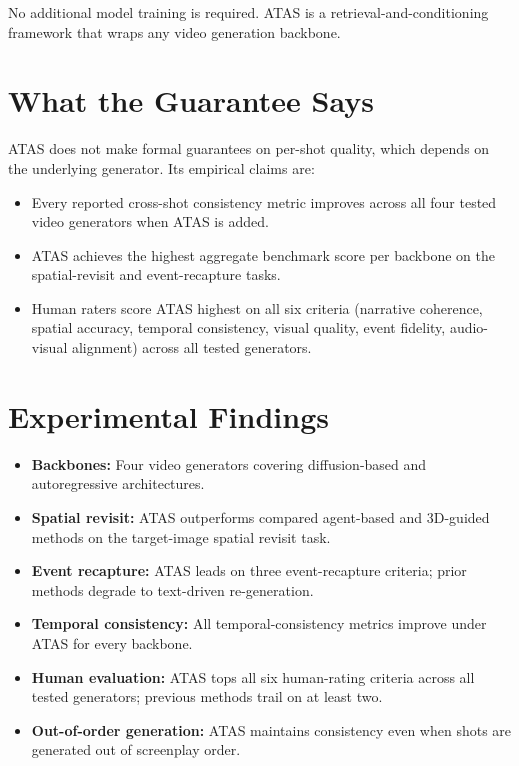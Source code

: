 \documentclass[10pt,twocolumn]{article}
\begin{document}
No additional model training is required. ATAS is a retrieval-and-conditioning
framework that wraps any video generation backbone.

\section{What the Guarantee Says}

ATAS does not make formal guarantees on per-shot quality, which depends on the
underlying generator. Its empirical claims are:

\begin{itemize}[itemsep=2pt,parsep=0pt]
  \item Every reported cross-shot consistency metric improves across all four
    tested video generators when ATAS is added.
  \item ATAS achieves the highest aggregate benchmark score per backbone on the
    spatial-revisit and event-recapture tasks.
  \item Human raters score ATAS highest on all six criteria (narrative coherence,
    spatial accuracy, temporal consistency, visual quality, event fidelity,
    audio-visual alignment) across all tested generators.
\end{itemize}

\section{Experimental Findings}

\begin{itemize}[itemsep=2pt,parsep=0pt]
  \item \textbf{Backbones:} Four video generators covering diffusion-based and
    autoregressive architectures.
  \item \textbf{Spatial revisit:} ATAS outperforms compared agent-based and
    3D-guided methods on the target-image spatial revisit task.
  \item \textbf{Event recapture:} ATAS leads on three event-recapture criteria;
    prior methods degrade to text-driven re-generation.
  \item \textbf{Temporal consistency:} All temporal-consistency metrics improve
    under ATAS for every backbone.
  \item \textbf{Human evaluation:} ATAS tops all six human-rating criteria
    across all tested generators; previous methods trail on at least two.
  \item \textbf{Out-of-order generation:} ATAS maintains consistency even when
    shots are generated out of screenplay order.
\end{itemize}
\end{document}
